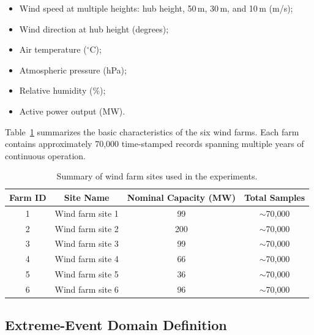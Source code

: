 \documentclass[a4paper]{cas-sc}
\begin{document}
\begin{itemize}
    \item Wind speed at multiple heights: hub height, 50\,m, 30\,m, and 10\,m (m/s);
    \item Wind direction at hub height (degrees);
    \item Air temperature ($^\circ$C);
    \item Atmospheric pressure (hPa);
    \item Relative humidity (\%);
    \item Active power output (MW).
\end{itemize}

Table~\ref{tab:farm_summary} summarizes the basic characteristics of the six wind farms. Each farm contains approximately 70{,}000 time-stamped records spanning multiple years of continuous operation.

\begin{table}[ht]
\centering
\caption{Summary of wind farm sites used in the experiments.}
\setlength{\tabcolsep}{4mm}
\begin{tabular}{cccc}
\toprule
Farm ID & Site Name & Nominal Capacity (MW) & Total Samples \\
\midrule
1 & Wind farm site 1 & 99  & $\sim$70{,}000 \\
2 & Wind farm site 2 & 200 & $\sim$70{,}000 \\
3 & Wind farm site 3 & 99  & $\sim$70{,}000 \\
4 & Wind farm site 4 & 66  & $\sim$70{,}000 \\
5 & Wind farm site 5 & 36  & $\sim$70{,}000 \\
6 & Wind farm site 6 & 96  & $\sim$70{,}000 \\
\bottomrule
\end{tabular}
\label{tab:farm_summary}
\end{table}

\subsection{Extreme-Event Domain Definition}\label{sec:extreme_def}
\end{document}
